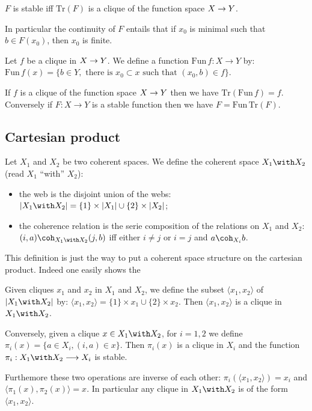 \begin{theorem}
$F$ is stable iff $\mathrm{Tr}(F)$ is a clique of the function space $X\rightarrow Y$.
\end{theorem}

In particular the continuity of \(F\) entails that if \(x_0\) is minimal
such that \(b\in F(x_0)\), then \(x_0\) is finite.

\begin{definition}
Let $f$ be a clique in $X\rightarrow Y$. We define a function $\mathrm{Fun}\,f:X\longrightarrow Y$ by: $\mathrm{Fun}\,f(x) = \{b\in Y,\text{ there is }x_0\subset x\text{ such that }(x_0, b)\in f\}$.
\end{definition}

\begin{theorem}[Closure]
If $f$ is a clique of the function space $X\rightarrow Y$ then we have $\mathrm{Tr}(\mathrm{Fun}\,f) = f$. Conversely if $F:X\longrightarrow Y$ is a stable function then we have $F = \mathrm{Fun}\,\mathrm{Tr}(F)$.
\end{theorem}

\subsection{Cartesian product}\label{cartesian-product}

\begin{definition}
Let $X_1$ and $X_2$ be two coherent spaces. We define the coherent space $X_1\with X_2$ (read $X_1$ ``with'' $X_2$):
\begin{itemize}
\item the web is the disjoint union of the webs: $\web{X_1\with X_2} = \{1\}\times\web{X_1}\cup \{2\}\times\web{X_2}$;
\item the coherence relation is the serie composition of the relations on $X_1$ and $X_2$: $(i, a)\coh_{X_1\with X_2}(j, b)$ iff either $i\neq j$ or $i=j$ and $a\coh_{X_i} b$.
\end{itemize}
\end{definition}

This definition is just the way to put a coherent space structure on the
cartesian product. Indeed one easily shows the

\begin{theorem}
Given cliques $x_1$ and $x_2$ in $X_1$ and $X_2$, we define the subset $\langle x_1, x_2\rangle$ of $\web{X_1\with X_2}$ by: $\langle x_1, x_2\rangle = \{1\}\times x_1\cup \{2\}\times x_2$. Then $\langle x_1, x_2\rangle$ is a clique in $X_1\with X_2$.

Conversely, given a clique $x\in X_1\with X_2$, for $i=1,2$ we define $\pi_i(x) = \{a\in X_i, (i, a)\in x\}$. Then $\pi_i(x)$ is a clique in $X_i$ and the function $\pi_i:X_1\with X_2\longrightarrow X_i$ is stable.

Furthemore these two operations are inverse of each other: $\pi_i(\langle x_1, x_2\rangle) = x_i$ and $\langle\pi_1(x), \pi_2(x)\rangle = x$. In particular any clique in $X_1\with X_2$ is of the form $\langle x_1, x_2\rangle$.
\end{theorem}

